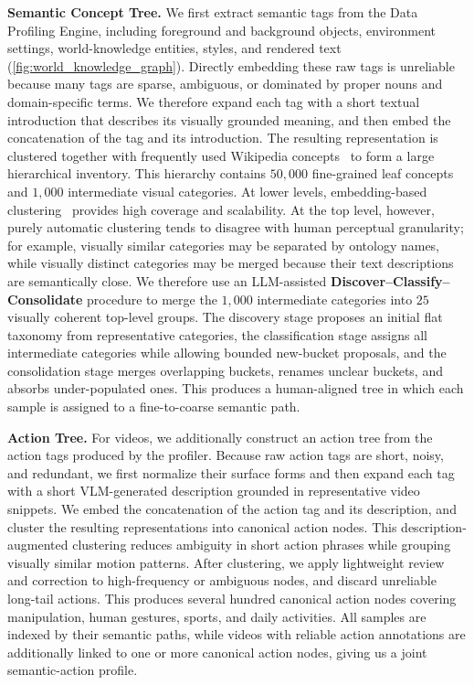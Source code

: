 \noindent\textbf{Semantic Concept Tree.}
We first extract semantic tags from the Data Profiling Engine, including foreground and background objects, environment settings, world-knowledge entities, styles, and rendered text (\cref{fig:world_knowledge_graph}).
Directly embedding these raw tags is unreliable because many tags are sparse, ambiguous, or dominated by proper nouns and domain-specific terms.
We therefore expand each tag with a short textual introduction that describes its visually grounded meaning, and then embed the concatenation of the tag and its introduction.
The resulting representation is clustered together with frequently used Wikipedia concepts~\cite{wikidump,Page1999ThePC} to form a large hierarchical inventory.
This hierarchy contains $50{,}000$ fine-grained leaf concepts and $1{,}000$ intermediate visual categories.
At lower levels, embedding-based clustering~\cite{vo2024automatic} provides high coverage and scalability.
At the top level, however, purely automatic clustering tends to disagree with human perceptual granularity; for example, visually similar categories may be separated by ontology names, while visually distinct categories may be merged because their text descriptions are semantically close.
We therefore use an LLM-assisted \textbf{Discover--Classify--Consolidate} procedure to merge the $1{,}000$ intermediate categories into $25$ visually coherent top-level groups.
The discovery stage proposes an initial flat taxonomy from representative categories, the classification stage assigns all intermediate categories while allowing bounded new-bucket proposals, and the consolidation stage merges overlapping buckets, renames unclear buckets, and absorbs under-populated ones.
This produces a human-aligned tree in which each sample is assigned to a fine-to-coarse semantic path.

\noindent\textbf{Action Tree.}
For videos, we additionally construct an action tree from the action tags produced by the profiler.
Because raw action tags are short, noisy, and redundant, we first normalize their surface forms and then expand each tag with a short VLM-generated description grounded in representative video snippets.
We embed the concatenation of the action tag and its description, and cluster the resulting representations into canonical action nodes.
This description-augmented clustering reduces ambiguity in short action phrases while grouping visually similar motion patterns.
After clustering, we apply lightweight review and correction to high-frequency or ambiguous nodes, and discard unreliable long-tail actions.
This produces several hundred canonical action nodes covering manipulation, human gestures, sports, and daily activities.
All samples are indexed by their semantic paths, while videos with reliable action annotations are additionally linked to one or more canonical action nodes, giving us a joint semantic-action profile.

